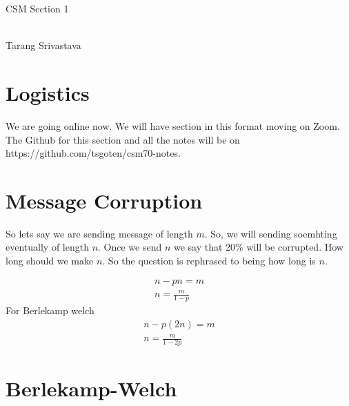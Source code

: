 \documentclass[10pt, twocolumn]{article}
\author{Tarang Srivastava}
\newcommand{\makechaptertitle}[1]{
\begin{center}
	\begin{large}
		#1
	\end{large}
	\begin{small}
		\\Tarang Srivastava
	\end{small}
\end{center}
}
\begin{document}
\makechaptertitle{CSM Section 1}

\section{Logistics}
We are going online now. We will have section in this format moving on Zoom.
The Github for this section and all the notes will be on https://github.com/tsgoten/csm70-notes.

\section{Message Corruption}
So lets say we are sending message of length $ m $. So, we will sending soemhting eventually of length $ n $. Once we send $n $ we say that 20\% will be corrupted. How long should we make $ n $.  
So the question is rephrased to being how long is $ n $.

\begin{align*} 
	n - pn = m \\
	n = \frac{m}{1 -p}
\end{align*}
For Berlekamp welch
\begin{align*} 
	n - p(2n) = m \\
	n = \frac{m}{1 - 2p}
\end{align*}

\section{}

\section{Berlekamp-Welch}
\end{document}
